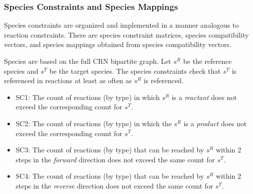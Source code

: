 \documentclass[webpdf,contemporary,large]{oup-authoring-template}
\theoremstyle{thmstyleone}%
\theoremstyle{thmstyletwo}%
\theoremstyle{thmstylethree}%
\begin{document}
\subsubsection{Species Constraints and Species Mappings}
Species constraints are organized and implemented in a manner analogous
to reaction constraints.
There are species constraint matrices, species compatibility vectors, and species mappings obtained from species compatibility vectors.

Species are based on
the full CRN bipartite graph.
Let $s^R$ be the reference species and $s^T$ be the target species.
The species constraints check that $s^T$ is referenced in reactions at least as often as $s^R$ is referenced.
\begin{itemize}
    \item SC1: The count of reactions (by type) in which $s^R$ is a {\em reactant} does not exceed the corresponding count for $s^T$.
    \item SC2: The count of reactions (by type) in which the $s^R$ is a {\em product} does not exceed the corresponding count for $s^T$.
     \item SC3: The count of reactions (by type) that can be reached by $s^R$ within 2 steps in the {\em forward} direction does not exceed the same count for $s^T$.
     \item SC4: The count of reactions (by type) that can be reached by $s^R$ within 2 steps in the {\em reverse} direction does not exceed the same count for $s^T$.
\end{itemize}

\end{document}
